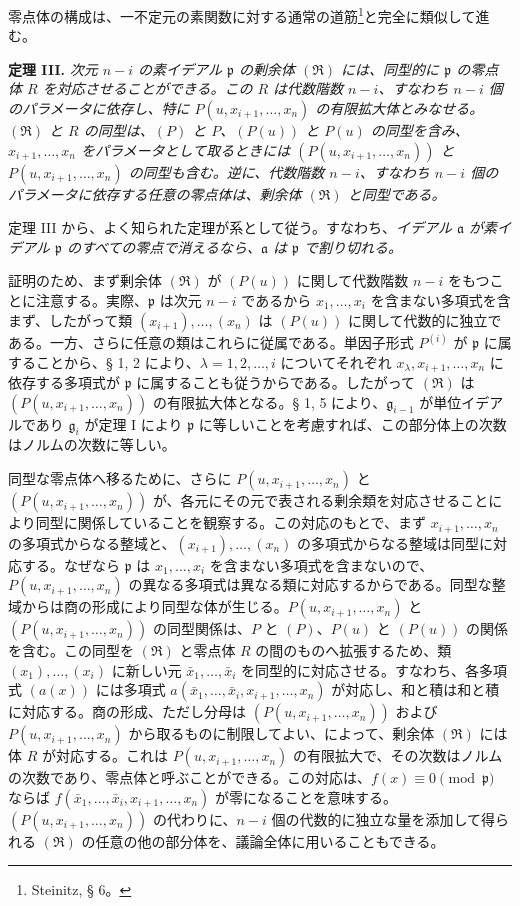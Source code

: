 \documentclass[11pt]{article}
\providecommand{\mR}{\mathfrak{R}}
\providecommand{\frakp}{\mathfrak p}
\providecommand{\fraka}{\mathfrak a}
\providecommand{\frakg}{\mathfrak g}
\providecommand{\mR}{\mathfrak{R}}
\providecommand{\frakp}{\mathfrak p}
\begin{document}
零点体の構成は、一不定元の素関数に対する通常の道筋\footnote{Steinitz, § 6。}と完全に類似して進む。

\textbf{定理 III.} \emph{次元 $n-i$ の素イデアル $\frakp$ の剰余体 $(\mR)$ には、同型的に $\frakp$ の零点体 $R$ を対応させることができる。この $R$ は代数階数 $n-i$、すなわち $n-i$ 個のパラメータに依存し、特に $P(u,x_{i+1},\ldots,x_n)$ の有限拡大体とみなせる。$(\mR)$ と $R$ の同型は、$(P)$ と $P$、$(P(u))$ と $P(u)$ の同型を含み、$x_{i+1},\ldots,x_n$ をパラメータとして取るときには $(P(u,x_{i+1},\ldots,x_n))$ と $P(u,x_{i+1},\ldots,x_n)$ の同型も含む。逆に、代数階数 $n-i$、すなわち $n-i$ 個のパラメータに依存する任意の零点体は、剰余体 $(\mR)$ と同型である。}

定理 III から、よく知られた定理が系として従う。すなわち、\emph{イデアル $\fraka$ が素イデアル $\frakp$ のすべての零点で消えるなら、$\fraka$ は $\frakp$ で割り切れる。}

証明のため、まず剰余体 $(\mR)$ が $(P(u))$ に関して代数階数 $n-i$ をもつことに注意する。実際、$\frakp$ は次元 $n-i$ であるから $x_1,\ldots,x_i$ を含まない多項式を含まず、したがって類 $(x_{i+1}),\ldots,(x_n)$ は $(P(u))$ に関して代数的に独立である。一方、さらに任意の類はこれらに従属である。単因子形式 $P^{(i)}$ が $\frakp$ に属することから、§ 1, 2 により、$\lambda=1,2,\ldots,i$ についてそれぞれ $x_\lambda,x_{i+1},\ldots,x_n$ に依存する多項式が $\frakp$ に属することも従うからである。したがって $(\mR)$ は $(P(u,x_{i+1},\ldots,x_n))$ の有限拡大体となる。§ 1, 5 により、$\frakg_{i-1}$ が単位イデアルであり $\frakg_i$ が定理 I により $\frakp$ に等しいことを考慮すれば、この部分体上の次数はノルムの次数に等しい。

同型な零点体へ移るために、さらに $P(u,x_{i+1},\ldots,x_n)$ と $(P(u,x_{i+1},\ldots,x_n))$ が、各元にその元で表される剰余類を対応させることにより同型に関係していることを観察する。この対応のもとで、まず $x_{i+1},\ldots,x_n$ の多項式からなる整域と、$(x_{i+1}),\ldots,(x_n)$ の多項式からなる整域は同型に対応する。なぜなら $\frakp$ は $x_1,\ldots,x_i$ を含まない多項式を含まないので、$P(u,x_{i+1},\ldots,x_n)$ の異なる多項式は異なる類に対応するからである。同型な整域からは商の形成により同型な体が生じる。$P(u,x_{i+1},\ldots,x_n)$ と $(P(u,x_{i+1},\ldots,x_n))$ の同型関係は、$P$ と $(P)$、$P(u)$ と $(P(u))$ の関係を含む。この同型を $(\mR)$ と零点体 $R$ の間のものへ拡張するため、類 $(x_1),\ldots,(x_i)$ に新しい元 $\bar{x}_1,\ldots,\bar{x}_i$ を同型的に対応させる。すなわち、各多項式 $(a(x))$ には多項式 $a(\bar{x}_1,\ldots,\bar{x}_i,x_{i+1},\ldots,x_n)$ が対応し、和と積は和と積に対応する。商の形成、ただし分母は $(P(u,x_{i+1},\ldots,x_n))$ および $P(u,x_{i+1},\ldots,x_n)$ から取るものに制限してよい、によって、剰余体 $(\mR)$ には体 $R$ が対応する。これは $P(u,x_{i+1},\ldots,x_n)$ の有限拡大で、その次数はノルムの次数であり、零点体と呼ぶことができる。この対応は、$f(x)\equiv0\pmod{\frakp}$ ならば $f(\bar{x}_1,\ldots,\bar{x}_i,x_{i+1},\ldots,x_n)$ が零になることを意味する。$(P(u,x_{i+1},\ldots,x_n))$ の代わりに、$n-i$ 個の代数的に独立な量を添加して得られる $(\mR)$ の\mbox{任意}の他の部分体を、議論全体に用いることもできる。
\end{document}
